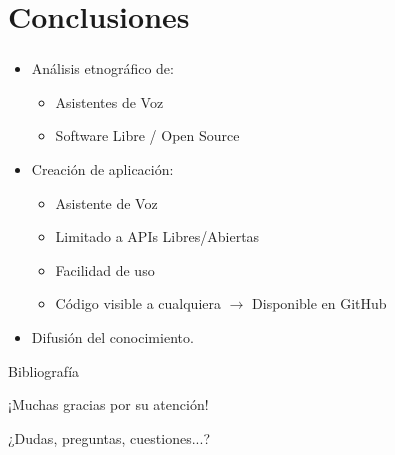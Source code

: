 
\section{Conclusiones}

\begin{frame}
	\frametitle{\insertsectionhead}
	
	\begin{itemize}
		\item Análisis etnográfico de:
		\begin{itemize}
			\item Asistentes de Voz
			\item Software Libre / Open Source
		\end{itemize}
		\item Creación de aplicación:
		\begin{itemize}
			\item Asistente de Voz
			\item Limitado a APIs Libres/Abiertas
			\item Facilidad de uso
			\item Código visible a cualquiera $\rightarrow$ Disponible en GitHub
		\end{itemize}
		\item Difusión del conocimiento.
	\end{itemize}
	
\end{frame}

\begin{frame}[allowframebreaks]{Bibliografía}

  
  

\end{frame}

\begin{frame}{}
	
	\Huge{¡Muchas gracias por su atención!}
	
	\normalsize{¿Dudas, preguntas, cuestiones...?}
\end{frame}
